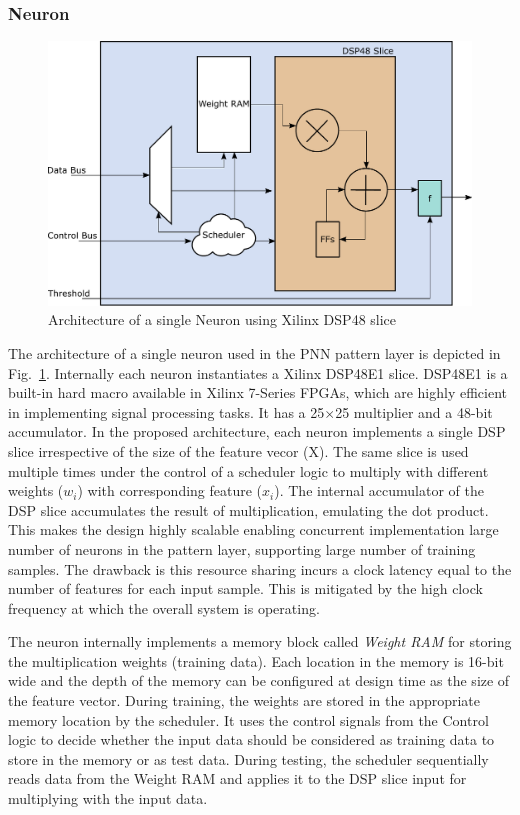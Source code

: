 \subsubsection{\bf Neuron}
\begin{figure}[t]
\centering
   \includegraphics[height=0.6\columnwidth]{Figures/neuron.pdf}
   \caption{Architecture of a single Neuron using Xilinx DSP48 slice}
   \label{fig:neuron}
\end{figure}
The architecture of a single neuron used in the PNN pattern layer is depicted in Fig.~\ref{fig:neuron}.
Internally each neuron instantiates a Xilinx DSP48E1 slice.
DSP48E1 is a built-in hard macro available in Xilinx 7-Series FPGAs, which are highly efficient in implementing signal processing tasks.
It has a 25$\times$25 multiplier and a 48-bit accumulator.
In the proposed architecture, each neuron implements a single DSP slice irrespective of the size of the feature vecor (X).
The same slice is used multiple times under the control of a scheduler logic to multiply with different weights ($w_{i}$) with corresponding feature ($x_{i}$).
The internal accumulator of the DSP slice accumulates the result of multiplication, emulating the dot product.
This makes the design highly scalable enabling concurrent implementation large number of neurons in the pattern layer, supporting large number of training samples.
The drawback is this resource sharing incurs a clock latency equal to the number of features for each input sample.
This is mitigated by the high clock frequency at which the overall system is operating.

The neuron internally implements a memory block called \emph{Weight RAM} for storing the multiplication weights (training data).
Each location in the memory is 16-bit wide and the depth of the memory can be configured at design time as the size of the feature vector.
During training, the weights are stored in the appropriate memory location by the scheduler.
It uses the control signals from the Control logic to decide whether the input data should be considered as training data to store in the memory or as test data.
During testing, the scheduler sequentially reads data from the Weight RAM and applies it to the DSP slice input for multiplying with the input data.

